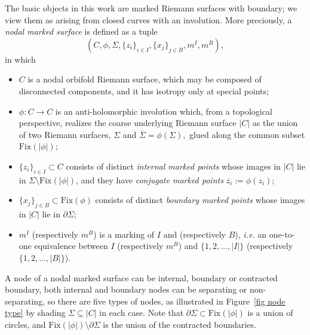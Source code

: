 \documentclass[11pt,a4paper]{article}
\theoremstyle{definition}
\theoremstyle{remark}
\numberwithin{equation}{section}
\begin{document}
The basic objects in this work are marked Riemann surfaces with boundary; we view them as arising from closed curves with an involution.  More preciously, a \textit{nodal marked surface} is defined as a tuple
$$(C, \phi, \Sigma, \{z_i\}_{i \in I}, \{x_j\}_{j \in B}, m^I, m^B),$$
in which
\begin{itemize}
\item $C$ is a nodal orbifold Riemann surface, which may be composed of disconnected components, and it has isotropy only at special points;
\item $\phi: C \to C$ is an anti-holomorphic involution which, from a topological perspective, realizes the coarse underlying Riemann surface $|C|$  as the union of two Riemann surfaces, $\Sigma$ and $\overline{\Sigma}=\phi(\Sigma),$ glued along the common subset $\text{Fix}(|\phi|)$;
\item $\{z_i\}_{i \in I}\subset  C$ consists of distinct \textit{internal marked points} whose images in $|C|$ lie in $\Sigma\setminus\text{Fix}(|\phi|)$, and they have \textit{conjugate marked points} $\overline{z_i}:= \phi(z_i)$;
\item $\{x_j\}_{j \in B} \subset \text{Fix}(\phi)$ consists of distinct \textit{boundary marked points} whose images in $|C|$ lie in ${\partial} \Sigma$;
\item $m^I$ (respectively $m^B$) is a marking of $I$ and (respectively $B$), \textit{i.e.} an one-to-one equivalence between  $I$ (respectively $m^B$) and $\{1,2,\dots,\lvert I \rvert\}$ (respectively $\{1,2,\dots,\lvert B \rvert\}$).
\end{itemize}


A node of a nodal marked surface can be internal, boundary or contracted boundary, both internal and boundary nodes can be separating or non-separating, so there are five types of nodes, as illustrated in Figure~\ref{fig node type} by shading $\Sigma \subseteq |C|$ in each case.  Note that ${\partial}\Sigma\subset\text{Fix}(|\phi|)$ is a union of circles, and $\text{Fix}(|\phi|)\setminus{\partial}\Sigma$ is the union of the contracted boundaries.
\end{document}

